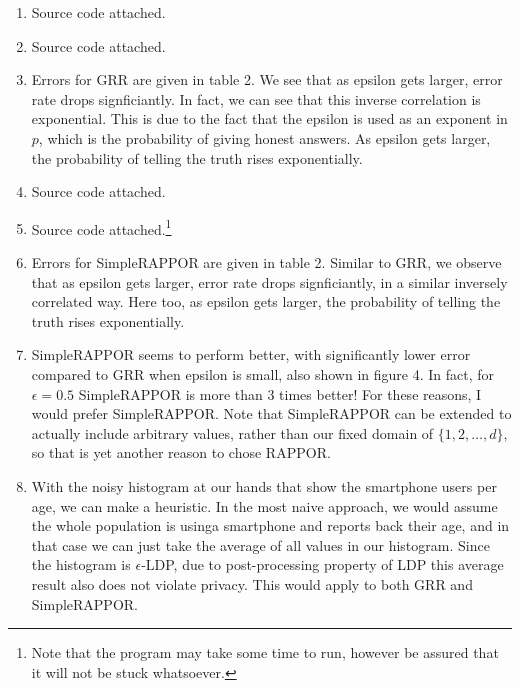 \documentclass[12pt,reqno]{amsart}
\begin{document}
\begin{enumerate}[label=(\alph*)]
	\item Source code attached.
	\item Source code attached.
	\item Errors for GRR are given in table 2. We see that as epsilon gets larger, error rate drops signficiantly. In fact, we can see that this inverse correlation is exponential. This is due to the fact that the epsilon is used as an exponent in $p$, which is the probability of giving honest answers. As epsilon gets larger, the probability of telling the truth rises exponentially.
	\item Source code attached.
	\item Source code attached.\footnote{Note that the program may take some time to run, however be assured that it will not be stuck whatsoever.}
	\item Errors for SimpleRAPPOR are given in table 2.  Similar to GRR, we observe that as epsilon gets larger, error rate drops signficiantly, in a similar inversely correlated way. Here too, as epsilon gets larger, the probability of telling the truth rises exponentially.
	\item SimpleRAPPOR seems to perform better, with significantly lower error compared to GRR when epsilon is small, also shown in figure 4. In fact, for $\epsilon=0.5$ SimpleRAPPOR is more than 3 times better! For these reasons, I would prefer SimpleRAPPOR. Note that SimpleRAPPOR can be extended to actually include arbitrary values, rather than our fixed domain of $\{1, 2, \ldots, d\}$, so that is yet another reason to chose RAPPOR.

	\item With the noisy histogram at our hands that show the smartphone users per age, we can make a heuristic. In the most naive approach, we would assume the whole population is usinga smartphone and reports back their age, and in that case we can just take the average of all values in our histogram. Since the histogram is $\epsilon$-LDP, due to post-processing property of LDP this average result also does not violate privacy. This would apply to both GRR and SimpleRAPPOR.
\end{enumerate}
\end{document}
